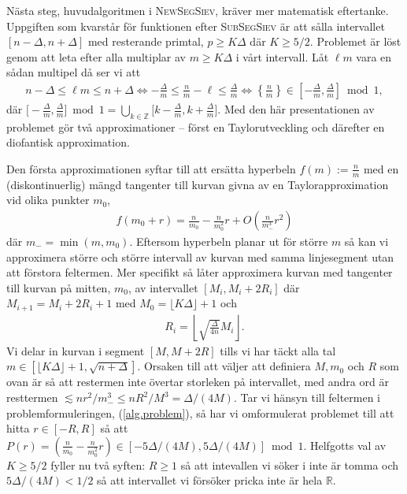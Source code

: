 Nästa steg, huvudalgoritmen i \textsc{NewSegSiev}, kräver mer matematisk eftertanke. Uppgiften som kvarstår för funktionen efter \textsc{SubSegSiev} är att sålla intervallet \([n - \Delta, n + \Delta]\) med resterande primtal, \( p \geq K \Delta\) där \(K \geq 5/2\). Problemet är löst genom att leta efter alla multiplar av \(m \geq K \Delta\) i vårt intervall. Låt \(\ell m\) vara en sådan multipel då ser vi att
\begin{align} \label{alg.problem}
    n - \Delta \leq \ell m \leq n + \Delta \Longleftrightarrow 
    - \frac{\Delta}{m} \leq \frac{n}{m} - \ell \leq \frac{\Delta}{m} \Longleftrightarrow \left\{ \frac{n}{m} \right\} \in \left[- \frac{\Delta}{m}, \frac{\Delta}{m} \right] \bmod 1,
\end{align}
där $\big[- \frac{\Delta}{m}, \frac{\Delta}{m} \big] \bmod 1 = \bigcup_{k \in \mathbb{Z}} \big[k - \frac{\Delta}{m}, k + \frac{\Delta}{m} \big]$. Med den här presentationen av problemet gör \cite{HaraldSieve} två approximationer -- först en Taylorutveckling och därefter en diofantisk approximation. 

Den första approximationen syftar till att ersätta hyperbeln \(f(m) := \frac{n}{m}\) med en (diskontinuerlig) mängd tangenter till kurvan givna av en Taylorapproximation vid olika punkter \(m_0\),
\begin{align*}
    f(m_0 + r) = \frac{n}{m_0} - \frac{n}{m_0^2} r + O\left(\frac{n}{m_-^3} r^2 \right)
\end{align*} %
där \(m_- = \min(m, m_0)\). Eftersom hyperbeln planar ut för större $m$ så kan vi approximera större och större intervall av kurvan med samma linjesegment utan att förstora feltermen. Mer specifikt så låter \cite{HaraldSieve} approximera kurvan med tangenter till kurvan på mitten, $m_0$, av intervallet \([M_i, M_i + 2R_i]\) där  $M_{i + 1} = M_i + 2R_i + 1$ med $M_0 = \lfloor K \Delta \rfloor + 1$ och
\begin{align*}
    R_i = \left\lfloor \sqrt{\frac{\Delta}{4n}} M_i \right\rfloor .
\end{align*}
Vi delar in kurvan i segment \([M, M + 2R]\) tills vi har täckt alla tal \(m \in [  \lfloor K \Delta \rfloor + 1, \sqrt{n + \Delta}]\). Orsaken till att \cite{HaraldSieve} väljer att definiera \(M, m_0\) och \(R\) som ovan är så att restermen inte övertar storleken på intervallet, med andra ord är resttermen \(\lesssim nr^2/m_-^3 \leq nR^2/M^3 = \Delta / (4M)\). Tar vi hänsyn till feltermen i problemformuleringen, (\ref{alg.problem}), så har vi omformulerat problemet till att hitta \(r \in [-R, R]\) så att \(P(r) = (\frac{n}{m_0} - \frac{n}{m_0^2} r) \in [-5\Delta/(4M), 5\Delta/(4M)] \bmod{1}\). Helfgotts val av \(K \geq 5/2\) fyller nu två syften: \(R \geq 1\) så att intevallen vi söker i inte är tomma och \(5\Delta/(4M) < 1/2\) så att intervallet vi försöker pricka inte är hela \(\mathbb{R}\).

